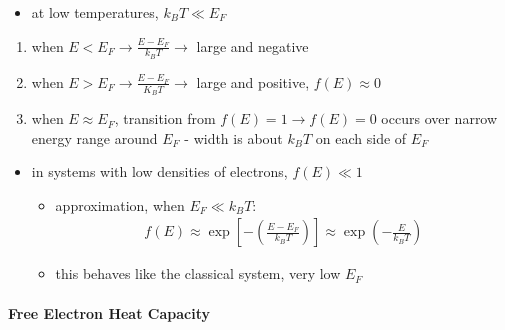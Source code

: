 \documentclass[a4paper,11pt,normalem]{article}
\begin{document}
\begin{itemize}
    \item at low temperatures, \(k_BT \ll E_F\)
\end{itemize}
\begin{enumerate}
    \item when \(E < E_F \to \frac{E - E_F}{k_BT} \to\) large and negative
    \item when \(E > E_F \to \frac{E - E_F}{K_BT} \to\) large and positive, \(f(E) \approx 0\)
    \item when \(E \approx E_F\), transition from \(f(E) = 1 \to f(E) = 0\) occurs over narrow energy range around \(E_F\) - width is about \(k_BT\) on each side of \(E_F\)
\end{enumerate}
\begin{itemize}
    \item in systems with low densities of electrons, \(f(E) \ll 1\)
        \begin{itemize}
            \item approximation, when \(E_F \ll k_BT\):
                \begin{align*}
                    f(E) \approx \exp\left[-\left(\frac{E - E_F}{k_BT}\right)\right] \approx \exp\left(-\frac{E}{k_BT}\right)
                \end{align*}
            \item this behaves like the classical system, very low \(E_F\)
        \end{itemize}
\end{itemize}

\paragraph{Free Electron Heat Capacity}
\end{document}
